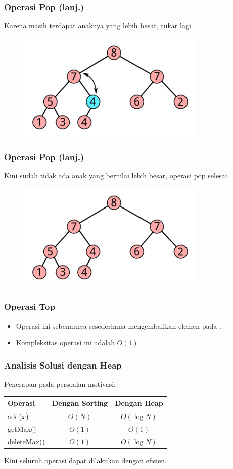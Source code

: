 \begin{frame}
\frametitle{Operasi Pop (lanj.)}
Karena masih terdapat anaknya yang lebih besar, tukar lagi.
\begin{figure}
  \includegraphics[width=9cm]{asset/pop-5.pdf}
\end{figure}
\end{frame}

\begin{frame}
\frametitle{Operasi Pop (lanj.)}
Kini sudah tidak ada anak yang bernilai lebih besar, operasi pop selesai.
\begin{figure}
  \includegraphics[width=9cm]{asset/pop-6.pdf}
\end{figure}
\end{frame}

\begin{frame}
\frametitle{Operasi Top}
\begin{itemize}
  \item Operasi ini sebenarnya sesederhana mengembalikan elemen pada  \pbinaryHeap.
  \item Kompleksitas operasi ini adalah $O(1)$.
\end{itemize}
\end{frame}

\begin{frame}
\frametitle{Analisis Solusi dengan Heap}
Penerapan \pheap pada persoalan motivasi:
\begin{table}[ht]
  \begin{tabular}{|l|c|c|}
    \hline Operasi  & Dengan Sorting & Dengan Heap \\
    \hline  add($x$) & $O(N)$ & $O(\log{N})$\\
    \hline  getMax() & $O(1)$ & $O(1)$\\
    \hline  deleteMax() & $O(1)$ & $O(\log{N})$\\
    \hline
  \end{tabular}
\end{table}  

Kini seluruh operasi dapat dilakukan dengan efisien.
\end{frame}

